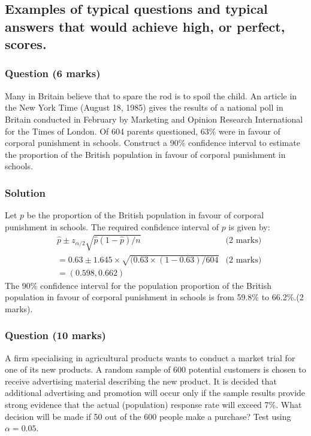 \documentclass[a4paper,oneside]{book}
\begin{document}
\subsection*{Examples of typical questions and typical answers that
  would achieve high, or perfect, scores.}

\subsubsection*{Question (6 marks)}

Many in Britain believe that to spare the rod is to spoil the
child. An article in the New York Time (August 18, 1985) gives the
results of a national poll in Britain conducted in February by
Marketing and Opinion Research International for the Times of
London. Of 604 parents questioned, 63\% were in favour of corporal
punishment in schools. Construct a 90\% confidence interval to
estimate the proportion of the British population in favour of
corporal punishment in schools.

\subsubsection*{Solution}
Let $p$ be the proportion of the British population in favour of corporal punishment in
schools. The required confidence interval of $p$ is given by:
\begin{align*}
  & \hat{p} \pm z_{\alpha/2}\sqrt{\hat{p}(1-\hat{p})/n}  & \text{(2 marks)}\\
  & = 0.63\pm 1.645\times \sqrt{(0.63\times (1-0.63)/604}  & \text{(2 marks)}\\
  & = (0.598,0.662)
\end{align*}
The 90\% confidence interval for the population proportion of the British population in favour of
corporal punishment in schools is from 59.8\% to 66.2\%.\quad (2 marks).

\subsubsection*{Question (10 marks)}
A firm specialising in agricultural products wants to conduct a market
trial for one of its new products. A random sample of 600 potential
customers is chosen to receive advertising material describing the new
product. It is decided that additional advertising and promotion will
occur only if the sample results provide strong evidence that the
actual (population) response rate will exceed
7\%. What decision will be made if 50 out of the 600 people make a purchase? Test using $\alpha = 0.05$.
\end{document}
